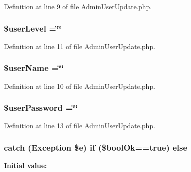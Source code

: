 Definition at line 9 of file Admin\-User\-Update.\-php.

\hypertarget{_admin_user_update_8php_aaeb0a34550135c6f3caac7aa1db9b0ae}{
\subsubsection[{\$user\-Level}]{\setlength{\rightskip}{0pt plus 5cm}\$user\-Level =\char`\"{}\char`\"{}}}\label{_admin_user_update_8php_aaeb0a34550135c6f3caac7aa1db9b0ae}


Definition at line 11 of file Admin\-User\-Update.\-php.

\hypertarget{_admin_user_update_8php_aff20833df389a26c0f9384512eec4a68}{
\subsubsection[{\$user\-Name}]{\setlength{\rightskip}{0pt plus 5cm}\$user\-Name =\char`\"{}\char`\"{}}}\label{_admin_user_update_8php_aff20833df389a26c0f9384512eec4a68}


Definition at line 10 of file Admin\-User\-Update.\-php.

\hypertarget{_admin_user_update_8php_a35248a9b2cd0ce90d3712a1a5b6eb161}{
\subsubsection[{\$user\-Password}]{\setlength{\rightskip}{0pt plus 5cm}\$user\-Password =\char`\"{}\char`\"{}}}\label{_admin_user_update_8php_a35248a9b2cd0ce90d3712a1a5b6eb161}


Definition at line 13 of file Admin\-User\-Update.\-php.

\hypertarget{_admin_user_update_8php_a93f1e974f12c5c233a1b622cf0cb96e7}{
\subsubsection[{else}]{\setlength{\rightskip}{0pt plus 5cm}catch (Exception \$e) if (\$bool\-Ok=={\bf true}) else}}\label{_admin_user_update_8php_a93f1e974f12c5c233a1b622cf0cb96e7}
{\bfseries Initial value\-:}


